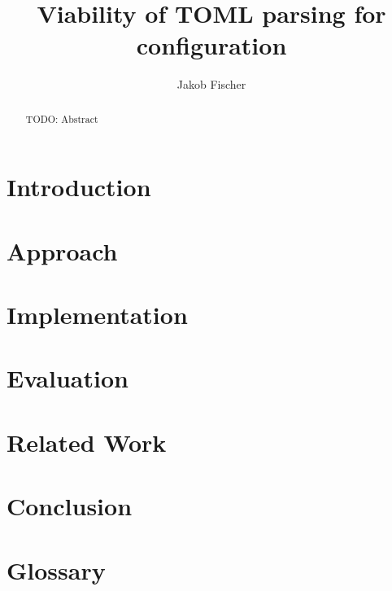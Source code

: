 \documentclass[12pt]{report}
\title{Viability of TOML parsing for configuration}
\author{Jakob Fischer}
\begin{document}
\maketitle

\begin{abstract}
TODO: Abstract
\end{abstract}

\chapter*{Introduction}

\cite{tomlwiki}

\chapter*{Approach}

\chapter*{Implementation}

\chapter*{Evaluation}

\chapter*{Related Work}

\chapter*{Conclusion}

\chapter*{Glossary}

\printglossary[type=\acronymtype]

{}

\end{document}
